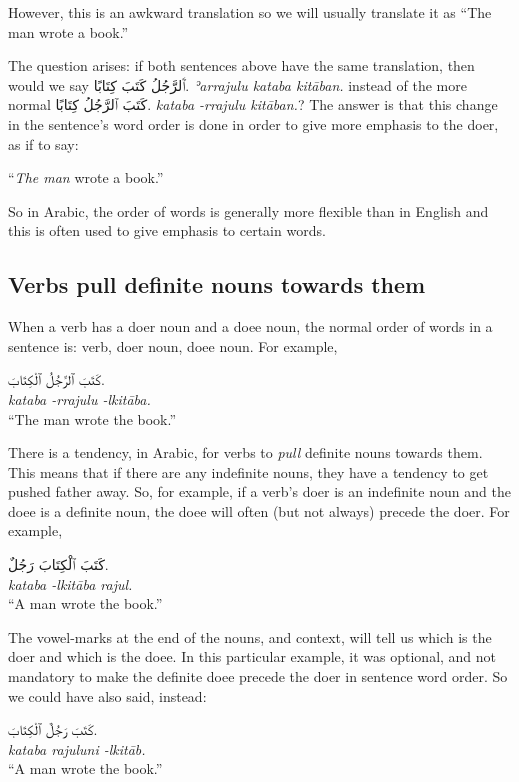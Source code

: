 \documentclass[
  10pt,
]{book}
\begin{document}
However, this is an awkward translation so we will usually translate it as \enquote{The man wrote a book.}

The question arises: if both sentences above have the same translation, then would we say \foreignlanguage{arabic}{ٱَلرَّجُلُ کَتَبَ کِتَابًا.} \emph{ʾarrajulu kataba kitāban.} instead of the more normal \foreignlanguage{arabic}{کَتَبَ ٱلرَّجُلُ کِتَابًا.} \emph{kataba -rrajulu kitāban.}? The answer is that this change in the sentence's word order is done in order to give more emphasis to the doer, as if to say:

\enquote{\emph{The man} wrote a book.}

So in Arabic, the order of words is generally more flexible than in English and this is often used to give emphasis to certain words.

\subsection{Verbs pull definite nouns towards them}\label{verbs-pull-definite-nouns-towards-them}

When a verb has a doer noun and a doee noun, the normal order of words in a sentence is: verb, doer noun, doee noun. For example,

\foreignlanguage{arabic}{کَتَبَ ٱلرَّجُلُ ٱلْکِتَابَ.}\\
\emph{kataba -rrajulu -lkitāba.}\\
\enquote{The man wrote the book.}

There is a tendency, in Arabic, for verbs to \emph{pull} definite nouns towards them. This means that if there are any indefinite nouns, they have a tendency to get pushed father away. So, for example,
if a verb's doer is an indefinite noun and the doee is a definite noun, the doee will often (but not always) precede the doer. For example,

\foreignlanguage{arabic}{کَتَبَ ٱلْکِتَابَ رَجُلٌ.}\\
\emph{kataba -lkitāba rajul.}\\
\enquote{A man wrote the book.}

The vowel-marks at the end of the nouns, and context, will tell us which is the doer and which is the doee. In this particular example, it was optional, and not mandatory to make the definite doee precede the doer in sentence word order. So we could have also said, instead:

\foreignlanguage{arabic}{کَتَبَ رَجُلٌ ٱلْکِتَابَ.}\\
\emph{kataba rajuluni -lkitāb.}\\
\enquote{A man wrote the book.}
\end{document}
